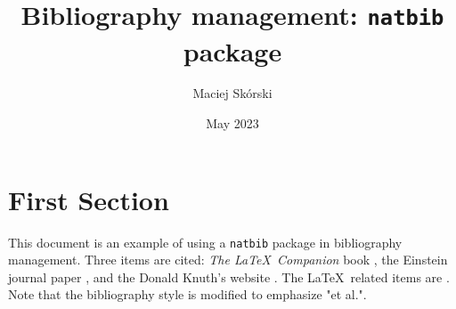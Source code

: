 \documentclass{article}
\title{Bibliography management: \texttt{natbib} package}
\author{Maciej Skórski}
\date {May 2023}
\begin{document}
\maketitle

\tableofcontents

\section{First Section}
This document is an example of using a \texttt{natbib} package in bibliography management. Three items are cited: \textit{The \LaTeX\ Companion} book \citet{latexcompanion}, the Einstein journal paper \citet{einstein}, and the Donald Knuth's website \cite{knuthwebsite}. The \LaTeX\ related items are \cite{latexcompanion,knuthwebsite}. Note that the bibliography style is modified to emphasize "et al.".

\medskip


\end{document}
